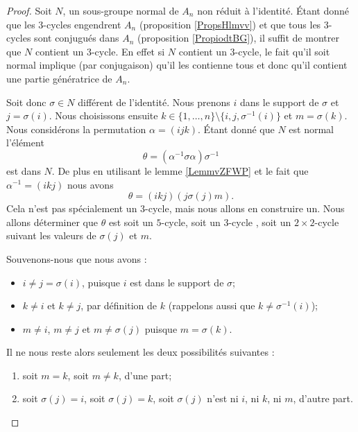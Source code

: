 \begin{proof}
    Soit \( N\), un sous-groupe normal de \( A_n\) non réduit à l'identité. Étant donné que les \( 3\)-cycles engendrent \( A_n\) (proposition \ref{PropsHlmvv}) et que tous les \( 3\)-cycles sont conjugués dans \( A_n\) (proposition \ref{PropiodtBG}), il suffit de montrer que \( N\) contient un \( 3\)-cycle. En effet si \( N\) contient un \( 3\)-cycle, le fait qu'il soit normal implique (par conjugaison) qu'il les contienne tous et donc qu'il contient une partie génératrice de \( A_n\).

    Soit donc \( \sigma\in N\) différent de l'identité. Nous prenons \( i\) dans le support de \( \sigma\) et \( j=\sigma(i)\). Nous choisissons ensuite \( k\in\{ 1,\ldots, n \}\setminus\{ i,j,\sigma^{-1}(i) \}\) et \( m=\sigma(k)\). Nous considérons la permutation \( \alpha=(ijk)\). Étant donné que \( N\) est normal l'élément
    \begin{equation}
        \theta=(\alpha^{-1}\sigma\alpha)\sigma^{-1}
    \end{equation}
    est dans \( N\). De plus en utilisant le lemme \ref{LemmvZFWP} et le fait que \( \alpha^{-1}=(ikj)\) nous avons
    \begin{equation}
        \theta=(ikj)(j\sigma(j)m).
    \end{equation}
    Cela n'est pas spécialement un \( 3\)-cycle, mais nous allons en construire un. Nous allons déterminer que \( \theta\) est soit un \( 5\)-cycle, soit un \( 3\)-cycle , soit un \( 2\times 2\)-cycle suivant les valeurs de \( \sigma(j)\) et \( m\). 

    Souvenons-nous que nous avons :
    \begin{itemize}
        \item
            \( i \neq j = \sigma(i) \), puisque $i$ est dans le support de \( \sigma \);
        \item
            \( k \neq i \) et \( k \neq j \), par définition de $k$ (rappelons aussi que \( k \neq \sigma^{-1}(i) \));
        \item
            \( m \neq i \), \( m \neq j \) et \( m \neq  \sigma(j) \) puisque \( m = \sigma(k) \).
    \end{itemize}
    Il ne nous reste alors seulement les deux possibilités suivantes :
    \begin{enumerate}
        \item
            soit \( m=k\), soit \( m \neq k \), d'une part;
        \item
            soit \( \sigma(j) = i \), soit \( \sigma(j) = k \), soit \( \sigma(j) \) n'est ni $i$, ni $k$, ni $m$, d'autre part.
    \end{enumerate}


\end{proof}
